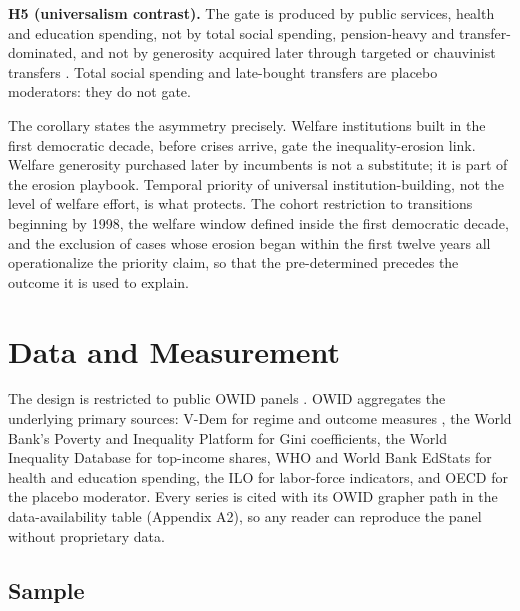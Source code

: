\textbf{H5 (universalism contrast).} The gate is produced by public services, health and education spending, not by total social spending, pension-heavy and transfer-dominated, and not by generosity acquired later through targeted or chauvinist transfers \citep{SzikraOktem2023, LendvaiBainton2021, Vanhuysse2006, Benczes2024, EnnserJedenastik2018}. Total social spending and late-bought transfers are placebo moderators: they do not gate.

The corollary states the asymmetry precisely. Welfare institutions built in the first democratic decade, before crises arrive, gate the inequality-erosion link. Welfare generosity purchased later by incumbents is not a substitute; it is part of the erosion playbook. Temporal priority of universal institution-building, not the level of welfare effort, is what protects. The cohort restriction to transitions beginning by 1998, the welfare window defined inside the first democratic decade, and the exclusion of cases whose erosion began within the first twelve years all operationalize the priority claim, so that the pre-determined precedes the outcome it is used to explain.

\section{Data and Measurement}

The design is restricted to public OWID panels \citep{OurWorldInData2025}. OWID aggregates the underlying primary sources: V-Dem for regime and outcome measures \citep{LuhrmannTannenberg2018, Coppedge2024}, the World Bank's Poverty and Inequality Platform for Gini coefficients, the World Inequality Database for top-income shares, WHO and World Bank EdStats for health and education spending, the ILO for labor-force indicators, and OECD for the placebo moderator. Every series is cited with its OWID grapher path in the data-availability table (Appendix A2), so any reader can reproduce the panel without proprietary data.

\subsection{Sample}

